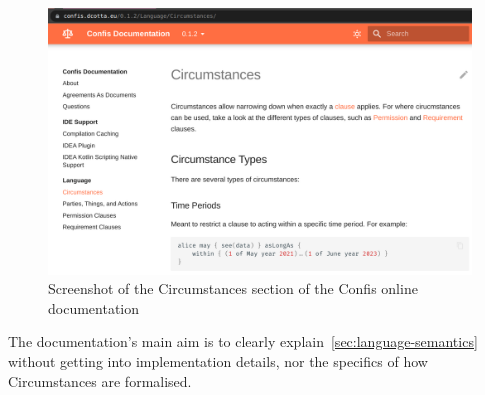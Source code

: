 \begin{figure}[h]
    \centering
    \includegraphics[width=\textwidth]{figures/online-docs}
    \caption{Screenshot of the Circumstances section of the Confis online documentation}
    \label{fig:online-docs}
\end{figure}

The documentation's main aim is to clearly explain~\autoref{sec:language-semantics} without getting into implementation details, nor the specifics of how Circumstances are formalised.


